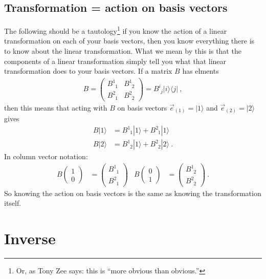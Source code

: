 \documentclass[
  11pt,
	colorful,
	raggedright,
]{tufte-style-thesis-flip}
\newcommand{\aij}[2]{^{#1}_{\phantom{#1}#2}}
\begin{document}
\subsection{Transformation = action on basis vectors}
The following should be a tautology\footnote{Or, as Tony Zee says: this is ``more obvious than obvious.''} if you know the action of a linear transformation on each of your basis vectors, then you know everything there is to know about the linear transformation. What we mean by this is that the components of a linear transformation simply tell you what that linear transformation does to your basis vectors. If a matrix $B$ has elments
\begin{align}
  B = 
  \begin{pmatrix}
    B\aij{1}{1} & B\aij{1}{2}\\
    B\aij{2}{1} & B\aij{2}{2}
  \end{pmatrix}
  = 
  B^{i}_{\phantom{i}j} |i\rangle\langle j| \ , 
\end{align}
then this means that acting with $B$ on basis vectors $\vec{e}_{(1)} = |1\rangle$ and $\vec{e}_{(2)} = |2\rangle$ gives
\begin{align}
  B|1\rangle &= B\aij{1}{1} |1 \rangle + B\aij{2}{1}|1\rangle 
  \\
  B|2\rangle &= B\aij{1}{2} |1 \rangle + B\aij{2}{2}|2\rangle  \ .
  \label{eq:B:basis:action}
\end{align}
In column vector notation:
\begin{align}
  B
  \begin{pmatrix}
  1 \\ 0
  \end{pmatrix}
  &= 
  \begin{pmatrix}
  B\aij{1}{1} \\ B\aij{2}{1}
  \end{pmatrix}
  &
  B
  \begin{pmatrix}
  0 \\ 1
  \end{pmatrix}
  &=
  \begin{pmatrix}
  B\aij{1}{2} \\ B\aij{2}{2}
  \end{pmatrix}\ .
\end{align}
So knowing the action on basis vectors is the same as knowing the transformation itself. 


\section{Inverse}
\end{document}
